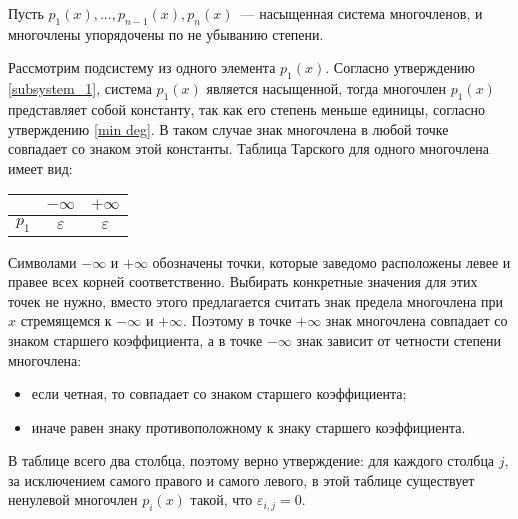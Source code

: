 Пусть $p_1(x), ... , p_{n-1}(x), p_n(x)$~--- насыщенная система многочленов, и многочлены упорядочены по не убыванию степени.

Рассмотрим подсистему из одного элемента $p_1(x)$. Согласно утверждению \ref{subsystem_1}, система $p_1(x)$ является насыщенной, тогда многочлен $p_1(x)$ представляет собой константу, так как его степень меньше единицы, согласно утверждению \ref{min deg}. В таком случае знак многочлена в любой точке совпадает со знаком этой константы. Таблица Тарского для одного многочлена имеет вид:
\begin{center}
    \begin{tabular}{ |c|c|c| } 
    \hline
        & $-\infty$ & $+\infty$ \\ 
    \hline
        $p_1$ & $\varepsilon$ & $\varepsilon$\\ 
    \hline
    \end{tabular}
\end{center}
Символами $-\infty$ и $+\infty$ обозначены точки, которые заведомо расположены левее и правее всех корней соответственно. Выбирать конкретные значения для этих точек не нужно, вместо этого предлагается считать знак предела многочлена при $x$ стремящемся к $-\infty$ и $+\infty$. Поэтому в точке $+\infty$ знак многочлена совпадает со знаком старшего коэффициента, а в точке $-\infty$ знак зависит от четности степени многочлена:
\begin{itemize}
    \item если четная, то совпадает со знаком старшего коэффициента;
    \item иначе равен знаку противоположному к знаку старшего коэффициента.
\end{itemize}
В таблице всего два столбца, поэтому верно утверждение: для каждого столбца $j$, за исключением самого правого и самого левого, в этой таблице существует ненулевой многочлен $p_i(x)$ такой, что $\varepsilon_{i, j} = 0$.

